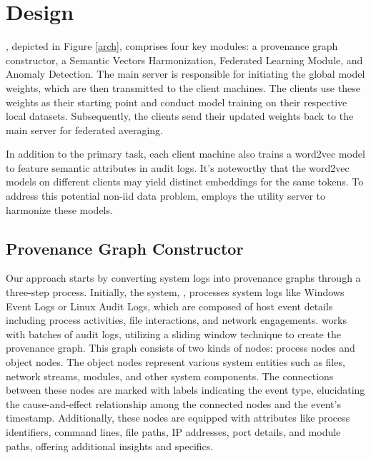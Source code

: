 \section{\Sys Design}
\label{sec:methodology}

\Sys, depicted in Figure \ref{arch}, comprises four key modules: a provenance graph constructor, a Semantic Vectors Harmonization, Federated Learning Module, and Anomaly Detection. The main server is responsible for initiating the global model weights, which are then transmitted to the client machines. The clients use these weights as their starting point and conduct model training on their respective local datasets. Subsequently, the clients send their updated weights back to the main server for federated averaging.

In addition to the primary task, each client machine also trains a word2vec model to feature semantic attributes in audit logs. It's noteworthy that the word2vec models on different clients may yield distinct embeddings for the same tokens. To address this potential non-iid data problem, \Sys employs the utility server to harmonize these models.

\subsection{Provenance Graph Constructor}
Our approach starts by converting system logs into provenance graphs through a three-step process. Initially, the system, \Sys, processes system logs like Windows Event Logs or Linux Audit Logs, which are composed of host event details including process activities, file interactions, and network engagements. \Sys works with batches of audit logs, utilizing a sliding window technique to create the provenance graph. This graph consists of two kinds of nodes: process nodes and object nodes. The object nodes represent various system entities such as files, network streams, modules, and other system components. The connections between these nodes are marked with labels indicating the event type, elucidating the cause-and-effect relationship among the connected nodes and the event's timestamp. Additionally, these nodes are equipped with attributes like process identifiers, command lines, file paths, IP addresses, port details, and module paths, offering additional insights and specifics.

